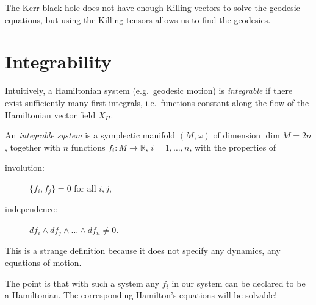 \begin{example}[]
  The Kerr black hole does not have enough Killing vectors to solve the geodesic equations, but using the Killing tensors allows us to find the geodesics.
\end{example}

\section{Integrability}%
\label{sec:integrability}

Intuitively, a Hamiltonian system (e.g.~geodesic motion) is \emph{integrable} if there exist sufficiently many first integrals, i.e.~functions constant along the flow of the Hamiltonian vector field $X_H$.

\begin{definition}
  An \emph{integrable system} is a symplectic manifold $(M, \omega)$ of dimension $\dim M = 2n$, together with $n$ functions $f_i \colon M \to \mathbb{R}$, $i = 1, \dots, n$, with the properties of
  \begin{description}
    \item[involution:] $\{f_i, f_j\} = 0$ for all $i, j$,
    \item[independence:] $df_i \wedge df_j \wedge \dots \wedge df_n \neq 0$.
  \end{description}
\end{definition}
This is a strange definition because it does not specify any dynamics, any equations of motion.

The point is that with such a system any $f_i$ in our system can be declared to be a Hamiltonian. The corresponding Hamilton's equations will be solvable!

